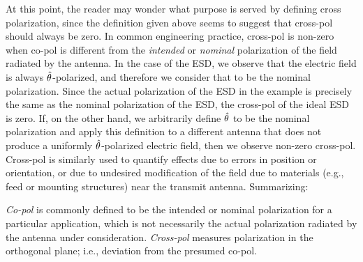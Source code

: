 At this point, the reader may wonder what purpose is served by defining cross polarization, since the definition given above seems to suggest that cross-pol should always be zero.
In common engineering practice, cross-pol is non-zero when co-pol is different from the \emph{intended} or \emph{nominal} polarization of the field radiated by the antenna.
In the case of the ESD, we observe that the electric field is always $\hat{\bf \theta}$-polarized, and therefore we consider that to be the nominal polarization.  Since the actual polarization of the ESD in the example is precisely the same as the nominal polarization of the ESD, the cross-pol of the ideal ESD is zero.  
If, on the other hand, we arbitrarily define $\hat{\bf \theta}$ to be the nominal polarization and apply this definition to a different antenna that does not produce a uniformly $\hat{\bf \theta}$-polarized electric field, then we observe non-zero cross-pol.
Cross-pol is similarly used to quantify effects due to errors in position or orientation,  or due to undesired modification of the field due to materials (e.g., feed or mounting structures) near the transmit antenna.
Summarizing: 
%
\begin{mdframed}[backgroundcolor=yellow!20,nobreak=true] 
\emph{Co-pol} is commonly defined to be the intended or nominal polarization for a particular application, which is not necessarily the actual polarization radiated by the antenna under consideration. \emph{Cross-pol} measures polarization in the orthogonal plane; i.e., deviation from the presumed co-pol.
\end{mdframed}

